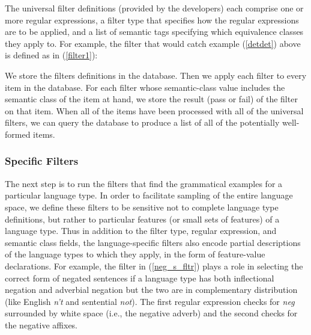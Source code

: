 \documentclass[11pt]{article}
\begin{document}

The universal filter definitions (provided by the developers)
each comprise one or more regular expressions, a filter type that
specifies how the regular expressions are to be applied, and a list of
semantic tags specifying which equivalence classes they apply to.  For
example, the filter that would catch example (\ref{detdet}) above
is defined as in (\ref{filter1}):

%
We store the filters definitions in the database.  Then we apply each filter to every item in the database.  For each filter whose semantic-class value
includes the semantic class of the item at hand, we store the result
(pass or fail) of the filter on that item.  When all of the items have been processed with all of the universal
filters, we can query the database to produce a list of all of the
potentially well-formed items. %

\subsubsection{Specific Filters}

The next step is to run the filters that find the grammatical
examples for a particular language type.  In order to facilitate
sampling of the entire language space, we define these filters to be
sensitive not to complete language type definitions, but rather to
particular features (or small sets of features) of a language type.
Thus in addition to the filter type, regular expression, and semantic
class fields, the language-specific filters also encode partial
descriptions  of the language types to which they 
apply, in the form of feature-value declarations.  For example, the filter in (\ref{neg_s_fltr})
plays a role in selecting the correct form of negated sentences if
a language type has both inflectional negation and adverbial negation
but the two are in complementary distribution (like English {\it n't}
and sentential {\it not}).  The first regular expression checks for
{\it neg} surrounded by white space (i.e., the negative adverb) and the
second checks for the negative affixes.
\end{document}
